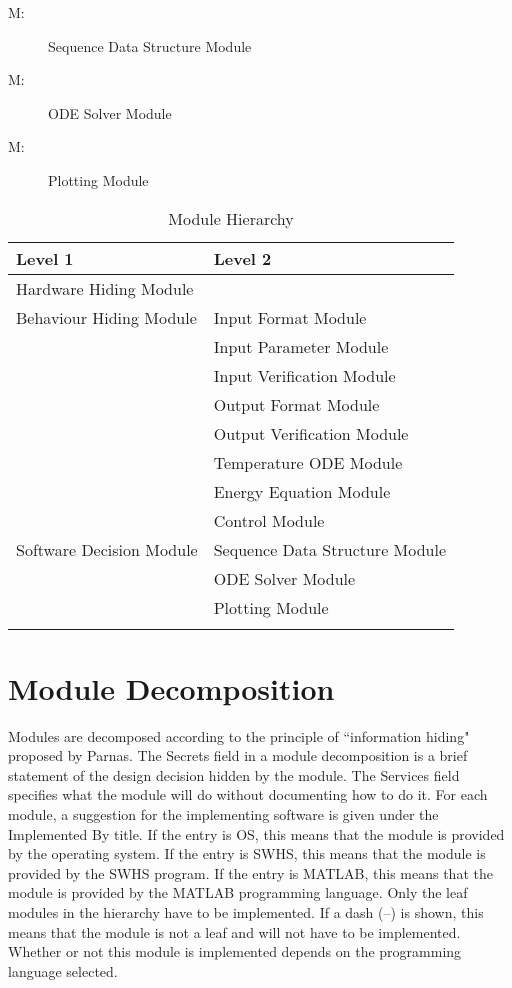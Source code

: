 \documentclass[12pt]{article}
\newcounter{modnum}
\newcommand{\mthemodnum}{M\themodnum}
\begin{document}
\begin{description}
\item[\mthemodnum\label{M:modseqserv}:]Sequence Data Structure Module
\end{description}
\begin{description}
\item[\mthemodnum\label{M:mododedesc}:]ODE Solver Module
\end{description}
\begin{description}
\item[\mthemodnum\label{M:modplotdesc}:]Plotting Module
\end{description}
\begin{longtable}{l l}
\toprule
Level 1 & Level 2
\\
\midrule
Hardware Hiding Module & 
\\
Behaviour Hiding Module & Input Format Module
\\
 & Input Parameter Module
\\
 & Input Verification Module
\\
 & Output Format Module
\\
 & Output Verification Module
\\
 & Temperature ODE Module
\\
 & Energy Equation Module
\\
 & Control Module
\\
Software Decision Module & Sequence Data Structure Module
\\
 & ODE Solver Module
\\
 & Plotting Module
\\
\bottomrule
\caption{Module Hierarchy}
\label{Table:ModuHier}
\end{longtable}
\section{Module Decomposition}
\label{Sec:ModuDeco}
Modules are decomposed according to the principle of ``information hiding" proposed by Parnas. The Secrets field in a module decomposition is a brief statement of the design decision hidden by the module. The Services field specifies what the module will do without documenting how to do it. For each module, a suggestion for the implementing software is given under the Implemented By title. If the entry is OS, this means that the module is provided by the operating system. If the entry is SWHS, this means that the module is provided by the SWHS program. If the entry is MATLAB, this means that the module is provided by the MATLAB programming language. Only the leaf modules in the hierarchy have to be implemented. If a dash (--) is shown, this means that the module is not a leaf and will not have to be implemented. Whether or not this module is implemented depends on the programming language selected.
\end{document}
